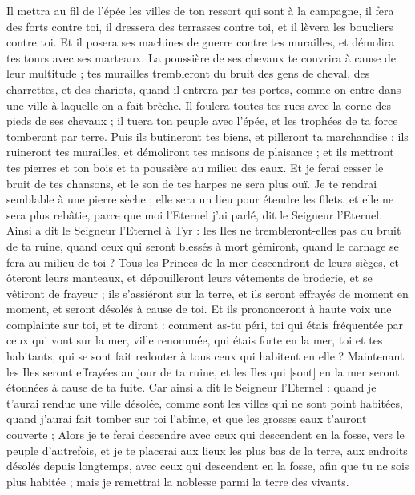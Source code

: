 \begin{multicols}{2}
Il mettra au fil de l'épée les villes de ton ressort qui sont à la campagne, il fera des forts contre toi, il dressera des terrasses contre toi, et il lèvera les boucliers contre toi.
Et il posera ses machines de guerre contre tes murailles, et démolira tes tours avec ses marteaux.
La poussière de ses chevaux te couvrira à cause de leur multitude ; tes murailles trembleront du bruit des gens de cheval, des charrettes, et des chariots, quand il entrera par tes portes, comme on entre dans une ville à laquelle on a fait brèche.
Il foulera toutes tes rues avec la corne des pieds de ses chevaux ; il tuera ton peuple avec l'épée, et les trophées de ta force tomberont par terre.
Puis ils butineront tes biens, et pilleront ta marchandise ; ils ruineront tes murailles, et démoliront tes maisons de plaisance ; et ils mettront tes pierres et ton bois et ta poussière au milieu des eaux.
Et je ferai cesser le bruit de tes chansons, et le son de tes harpes ne sera plus ouï.
Je te rendrai semblable à une pierre sèche ; elle sera un lieu pour étendre les filets, et elle ne sera plus rebâtie, parce que moi l'Eternel j'ai parlé, dit le Seigneur l'Eternel.
Ainsi a dit le Seigneur l'Eternel à Tyr : les Iles ne trembleront-elles pas du bruit de ta ruine, quand ceux qui seront blessés à mort gémiront, quand le carnage se fera au milieu de toi ?
Tous les Princes de la mer descendront de leurs sièges, et ôteront leurs manteaux, et dépouilleront leurs vêtements de broderie, et se vêtiront de frayeur ; ils s'assiéront sur la terre, et ils seront effrayés de moment en moment, et seront désolés à cause de toi.
Et ils prononceront à haute voix une complainte sur toi, et te diront : comment as-tu péri, toi qui étais fréquentée par ceux qui vont sur la mer, ville renommée, qui étais forte en la mer, toi et tes habitants, qui se sont fait redouter à tous ceux qui habitent en elle ?
Maintenant les Iles seront effrayées au jour de ta ruine, et les Iles qui [sont] en la mer seront étonnées à cause de ta fuite.
Car ainsi a dit le Seigneur l'Eternel : quand je t'aurai rendue une ville désolée, comme sont les villes qui ne sont point habitées, quand j'aurai fait tomber sur toi l'abîme, et que les grosses eaux t'auront couverte ;
Alors je te ferai descendre avec ceux qui descendent en la fosse, vers le peuple d'autrefois, et je te placerai aux lieux les plus bas de la terre, aux endroits désolés depuis longtemps, avec ceux qui descendent en la fosse, afin que tu ne sois plus habitée ; mais je remettrai la noblesse parmi la terre des vivants.

\end{multicols}
